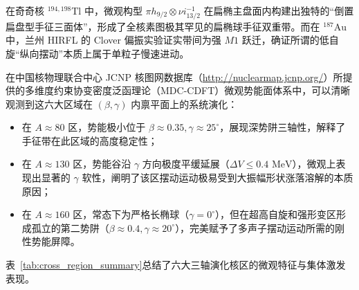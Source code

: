 在奇奇核 $^{194,198}\text{Tl}$ 中，微观构型 $\pi h_{9/2} \otimes \nu i_{13/2}^{-1}$ 在扁椭主盘面内构建出独特的“倒置扁盘型手征三面体”，形成了全核素图极其罕见的扁椭球手征双重带。而在 $^{187}\text{Au}$ 中，兰州 HIRFL 的 Clover 偏振实验证实带间为强 $M1$ 跃迁，确证所谓的低自旋“纵向摆动”本质上属于单粒子慢速进动。

在中国核物理联合中心 JCNP 核图网数据库（\url{http://nuclearmap.jcnp.org/}）所提供的多维度约束协变密度泛函理论（MDC-CDFT）微观势能面体系中，可以清晰观测到这六大区域在 $(\beta, \gamma)$ 内禀平面上的系统演化：
\begin{itemize}
    \item 在 $A \approx 80$ 区，势能极小位于 $\beta \approx 0.35, \gamma \approx 25^\circ$，展现深势阱三轴性，解释了手征带在此区域的高度稳定性；
    \item 在 $A \approx 130$ 区，势能谷沿 $\gamma$ 方向极度平缓延展（$\Delta V \le 0.4\text{ MeV}$），微观上表现出显著的 $\gamma$ 软性，阐明了该区摆动运动极易受到大振幅形状涨落溶解的本质原因；
    \item 在 $A \approx 160$ 区，常态下为严格长椭球（$\gamma = 0^\circ$），但在超高自旋和强形变区形成孤立的第二势阱（$\beta \approx 0.4, \gamma \approx 20^\circ$），完美赋予了多声子摆动运动所需的刚性势能屏障。
\end{itemize}

表~\ref{tab:cross_region_summary}总结了六大三轴演化核区的微观特征与集体激发表现。

